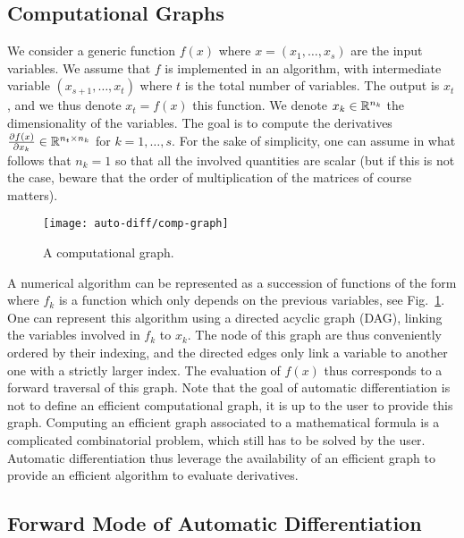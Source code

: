 \subsection{Computational Graphs}

We consider a generic function $f(x)$ where $x=(x_1,\ldots,x_s)$ are the input variables. We assume that $f$ is implemented in an algorithm, with intermediate variable $(x_{s+1},\ldots,x_t)$ where $t$ is the total number of variables. The output is $x_t$, and we thus denote $x_t=f(x)$ this function. We denote $x_k \in \mathbb{R}^{n_k}$ the dimensionality of the variables. The goal is to compute the derivatives $\frac{ \partial f(x)}{\partial x_k} \in \mathbb{R}^{n_t \times n_k}$ for $k=1,\ldots,s$. For the sake of simplicity, one can assume in what follows that $n_k=1$ so that all the involved quantities are scalar (but if this is not the case, beware that the order of multiplication of the matrices of course matters).

\begin{figure}
\centering
\texttt{[image: auto-diff/comp-graph]}
\caption{\label{fig-compgraph}
A computational graph.
}
\end{figure}

A numerical algorithm can be represented as a succession of functions of the form
where $f_k$ is a function which only depends on the previous variables, see Fig.~\ref{fig-compgraph}. One can represent this algorithm using a directed acyclic graph (DAG), linking the variables involved in $f_k$ to $x_k$. The node of this graph are thus conveniently ordered by their indexing, and the directed edges only link a variable to another one with a strictly larger index.
%
The evaluation of $f(x)$ thus corresponds to a forward traversal of this graph. 
% 
Note that the goal of automatic differentiation is not to define an efficient computational graph, it is up to the user to provide this graph. Computing an efficient graph associated to a mathematical formula is a complicated combinatorial problem, which still has to be solved by the user. Automatic differentiation thus leverage the availability of an efficient graph to provide an efficient algorithm to evaluate derivatives. 



\subsection{Forward Mode of Automatic Differentiation}

